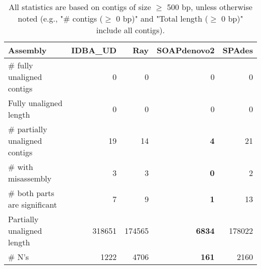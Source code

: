 \documentclass[12pt,a4paper]{article}
\begin{document}
\begin{table}[ht]
\begin{center}
\caption{All statistics are based on contigs of size $\geq$ 500 bp, unless otherwise noted (e.g., "\# contigs ($\geq$ 0 bp)" and "Total length ($\geq$ 0 bp)" include all contigs).}
\begin{tabular}{|l*{4}{|r}|}
\hline
Assembly & IDBA\_UD & Ray & SOAPdenovo2 & SPAdes \\ \hline
\# fully unaligned contigs & 0 & 0 & 0 & 0 \\ \hline
Fully unaligned length & 0 & 0 & 0 & 0 \\ \hline
\# partially unaligned contigs & 19 & 14 & {\bf 4} & 21 \\ \hline
\hspace{5mm}\# with misassembly & 3 & 3 & {\bf 0} & 2 \\ \hline
\hspace{5mm}\# both parts are significant & 7 & 9 & {\bf 1} & 13 \\ \hline
Partially unaligned length & 318651 & 174565 & {\bf 6834} & 178022 \\ \hline
\# N's & 1222 & 4706 & {\bf 161} & 2160 \\ \hline
\end{tabular}
\end{center}
\end{table}
\end{document}
